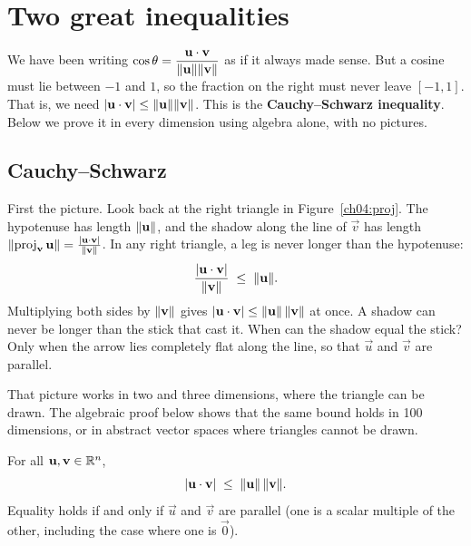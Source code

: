 \section{Two great inequalities}

We have been writing
$\cos\theta = \dfrac{\mathbf{u}\cdot\mathbf{v}}{\lVert\mathbf{u}\rVert\lVert\mathbf{v}\rVert}$ as if it
always made sense. But a cosine must lie between $-1$ and $1$, so the fraction on
the right must never leave $[-1,1]$. That is, we need
$\lvert\mathbf{u}\cdot\mathbf{v}\rvert \le \lVert\mathbf{u}\rVert\lVert\mathbf{v}\rVert$. This is the
\textbf{Cauchy--Schwarz inequality}. Below we prove it in every dimension using
algebra alone, with no pictures.

\subsection{Cauchy--Schwarz}

First the picture. Look back at the right triangle in Figure~\ref{ch04:proj}.
The hypotenuse has length $\lVert\mathbf{u}\rVert$, and the shadow along the line of $\vec v$ has
length $\lVert\operatorname{proj}_{\mathbf{v}}\mathbf{u}\rVert = \frac{\lvert\mathbf{u}\cdot\mathbf{v}\rvert}{\lVert\mathbf{v}\rVert}$.
In any right triangle, a leg is never longer than the hypotenuse:
\[
  \frac{\lvert\mathbf{u}\cdot\mathbf{v}\rvert}{\lVert\mathbf{v}\rVert} \;\le\; \lVert\mathbf{u}\rVert.
\]
Multiplying both sides by $\lVert\mathbf{v}\rVert$ gives $\lvert\mathbf{u}\cdot\mathbf{v}\rvert \le \lVert\mathbf{u}\rVert\,\lVert\mathbf{v}\rVert$
at once. A shadow can never be longer than the stick that cast it. When can the shadow equal the stick?
Only when the arrow lies completely flat along the line, so that $\vec u$ and $\vec v$ are parallel.

That picture works in two and three dimensions, where the triangle can be drawn. The
algebraic proof below shows that the same bound holds in 100 dimensions, or in
abstract vector spaces where triangles cannot be drawn.

\begin{theorem}\label{ch04:cs}
For all $\mathbf{u},\mathbf{v}\in\mathbb{R}^n$,
\[
  \lvert\mathbf{u}\cdot\mathbf{v}\rvert \;\le\; \lVert\mathbf{u}\rVert\,\lVert\mathbf{v}\rVert.
\]
Equality holds if and only if $\vec u$ and $\vec v$ are parallel (one is a scalar
multiple of the other, including the case where one is $\vec 0$).
\end{theorem}

